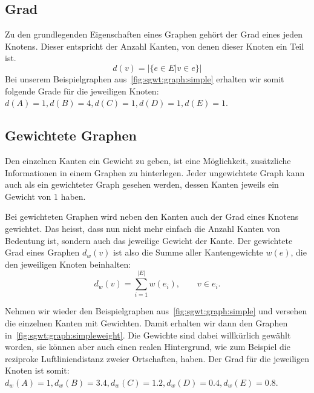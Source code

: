 \subsection{Grad}

Zu den grundlegenden Eigenschaften eines Graphen geh\"ort der Grad eines jeden 
Knotens. Dieser entspricht der Anzahl Kanten, von denen dieser Knoten ein 
Teil ist.
\begin{equation*}
    d(v) = | \{e \in E | v \in e \} |
\end{equation*}
Bei unserem Beispielgraphen aus~\cref{fig:sgwt:graph:simple} 
erhalten wir somit folgende Grade f\"ur die jeweiligen Knoten: $d(A) = 1, d(B) 
= 4, d(C) = 1, d(D) = 1, d(E) = 1$.

\subsection{Gewichtete Graphen}

Den einzelnen Kanten ein Gewicht zu geben, ist eine M\"oglichkeit, 
zus\"atzliche Informationen in einem Graphen zu hinterlegen. Jeder ungewichtete 
Graph kann auch als ein gewichteter Graph gesehen werden, dessen Kanten jeweils 
ein Gewicht von $1$ haben.

Bei gewichteten Graphen wird neben den Kanten auch der Grad eines Knotens 
gewichtet. Das heisst, dass nun nicht mehr einfach die Anzahl Kanten von 
Bedeutung ist, sondern auch das jeweilige Gewicht der Kante. Der gewichtete 
Grad eines Graphen $d_w(v)$ ist also die Summe aller Kantengewichte $w(e)$, 
die den jeweiligen Knoten beinhalten:
\begin{equation*}
    d_w(v) = \sum_{i = 1}^{|E|}w(e_i), \qquad v \in e_i.
\end{equation*}

Nehmen wir wieder den Beispielgraphen aus~\cref{fig:sgwt:graph:simple} und 
versehen die einzelnen Kanten mit Gewichten. Damit erhalten wir dann den 
Graphen in~\cref{fig:sgwt:graph:simpleweight}. Die Gewichte sind dabei 
willk\"urlich gew\"ahlt worden, sie k\"onnen aber auch einen realen 
Hintergrund, wie zum Beispiel die reziproke Luftliniendistanz zweier 
Ortschaften, haben. Der Grad f\"ur die jeweiligen Knoten ist somit: $d_w(A) = 
1, d_w(B) = 3.4, d_w(C) = 1.2, d_w(D) = 0.4, d_w(E) = 0.8$.

